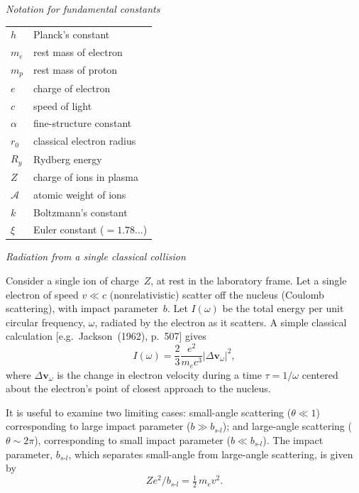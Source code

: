 \bigskip

\textit{Notation for fundamental constants}

\medskip

\noindent
\begin{tabular}{ll}
$h$            & Planck's constant \\
$m_e$          & rest mass of electron \\
$m_p$          & rest mass of proton \\
$e$            & charge of electron \\
$c$            & speed of light \\
$\alpha$       & fine-structure constant \\
$r_0$          & classical electron radius \\
$R_y$          & Rydberg energy \\
$Z$            & charge of ions in plasma \\
$\mathcal{A}$  & atomic weight of ions \\
$k$            & Boltzmann's constant \\
$\xi$          & Euler constant ($= 1.78\ldots$)
\end{tabular}

\bigskip

\textit{Radiation from a single classical collision}

\medskip

Consider a single ion of charge~$Z$, at rest in the laboratory frame. Let a single
electron of speed $v \ll c$ (nonrelativistic) scatter off the nucleus (Coulomb
scattering), with impact parameter~$b$. Let $I(\omega)$ be the total energy per unit
circular frequency, $\omega$, radiated by the electron as it scatters. A simple classical
calculation [e.g.\ Jackson~(1962)\cite{Jackson1962}, p.~507] gives
%
\begin{equation}
I(\omega) = \frac{2}{3} \frac{e^2}{m_e c^3} \left|\Delta \mathbf{v}_\omega\right|^2,
\tag{2.1.1}
\end{equation}
%
where $\Delta \mathbf{v}_\omega$ is the change in electron velocity during a time $\tau = 1/\omega$ centered
about the electron's point of closest approach to the nucleus.

It is useful to examine two limiting cases: small-angle scattering ($\theta \ll 1$)
corresponding to large impact parameter ($b \gg b_{s\text{-}l}$); and large-angle scattering
($\theta \sim 2\pi$), corresponding to small impact parameter ($b \ll b_{s\text{-}l}$). The impact
parameter, $b_{s\text{-}l}$, which separates small-angle from large-angle scattering, is given
by
%
\begin{equation}
Ze^2 / b_{s\text{-}l} = \tfrac{1}{2}\, m_e v^2.
\tag{2.1.2}
\end{equation}

